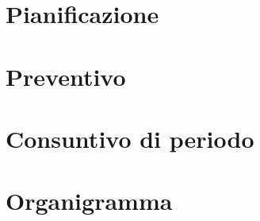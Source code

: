 \documentclass[11pt,a4paper]{article}
\begin{document}
	\section{Pianificazione}
		
		\newpage
				
	\section{Preventivo}
		
		\newpage
		
	\section{Consuntivo di periodo}
		
		\newpage

	\section{Organigramma}
		
		\newpage
\end{document}
